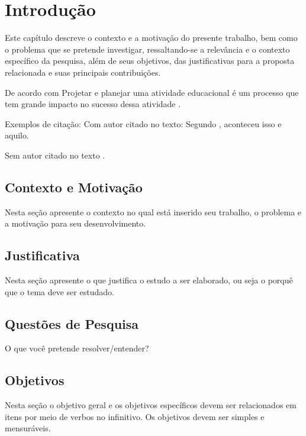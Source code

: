 \chapter{Introdução} 
\label{cha:introducao}
Este capítulo descreve o contexto e a motivação do presente trabalho, bem como o problema que se pretende investigar, ressaltando-se a relevância e o contexto específico da pesquisa, além de seus objetivos, das justificativas para a proposta relacionada e suas principais contribuições.

De acordo com  Projetar e planejar uma atividade educacional é um processo que tem grande impacto no sucesso dessa atividade \cite{maia2016reconceptualizing}.


Exemplos de citação:
Com autor citado no texto: Segundo , aconteceu isso e aquilo.

Sem autor citado no texto \cite{wazlawick2017metodologia}.

\section{Contexto e Motivação}

Nesta seção apresente o contexto no qual está inserido seu trabalho, o problema e a motivação para seu desenvolvimento.

\section{Justificativa}
Nesta seção apresente o que justifica o estudo a ser elaborado, ou seja o porquê que o tema deve ser estudado.

\section{Questões de Pesquisa}
O que você pretende resolver/entender?

\section{Objetivos}
Nesta seção o objetivo geral e os objetivos específicos devem ser relacionados em itens por meio de verbos no infinitivo. Os objetivos devem ser simples e mensuráveis.

